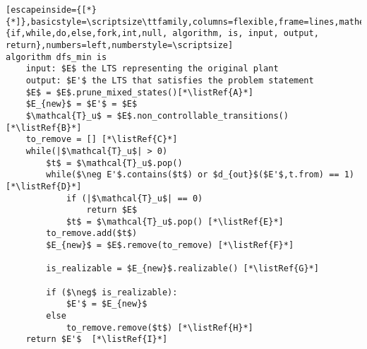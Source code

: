 \renewcommand{\ttdefault}{pcr}
\begin{lstlisting}[escapeinside={[*}{*]},basicstyle=\scriptsize\ttfamily,columns=flexible,frame=lines,mathescape=true,xleftmargin=3.0ex,keywordstyle=\textbf,morekeywords={if,while,do,else,fork,int,null, algorithm, is, input, output, return},numbers=left,numberstyle=\scriptsize]
algorithm dfs_min is
	input: $E$ the LTS representing the original plant
	output: $E'$ the LTS that satisfies the problem statement
	$E$ = $E$.prune_mixed_states()[*\listRef{A}*]
	$E_{new}$ = $E'$ = $E$ 
	$\mathcal{T}_u$ = $E$.non_controllable_transitions() [*\listRef{B}*]
	to_remove = [] [*\listRef{C}*]
	while(|$\mathcal{T}_u$| > 0)
		$t$ = $\mathcal{T}_u$.pop()
		while($\neg E'$.contains($t$) or $d_{out}$($E'$,t.from) == 1)[*\listRef{D}*]
			if (|$\mathcal{T}_u$| == 0)
				return $E$
			$t$ = $\mathcal{T}_u$.pop() [*\listRef{E}*]		
		to_remove.add($t$)
		$E_{new}$ = $E$.remove(to_remove) [*\listRef{F}*]
		
		is_realizable = $E_{new}$.realizable() [*\listRef{G}*]
		
		if ($\neg$ is_realizable):
			$E'$ = $E_{new}$
		else
			to_remove.remove($t$) [*\listRef{H}*]
	return $E'$  [*\listRef{I}*]
\end{lstlisting}